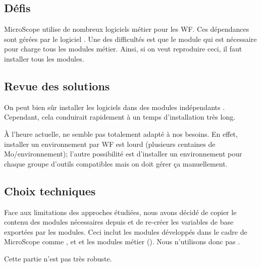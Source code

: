 \subsection{Défis}

MicroScope utilise de nombreux logiciels métier pour les WF.
Ces dépendances sont gérées par le logiciel .
Une des difficultés est que le module  qui est nécessaire pour 
charge tous les modules métier.
Ainsi, si on veut reproduire ceci, il faut installer tous les modules.

\subsection{Revue des solutions}

On peut bien sûr installer les logiciels dans des modules indépendants .
Cependant, cela conduirait rapidement à un temps d'installation très long.

À l'heure actuelle,  ne semble pas totalement adapté à nos besoins.
En effet, installer un environnement par WF est lourd (plusieurs centaines de Mo/environnement);
l'autre possibilité est d'installer un environnement pour chaque groupe d'outils compatibles mais on doit gérer ça manuellement.

\subsection{Choix techniques}

Face aux limitations des approches étudiées, nous avons décidé de copier le contenu des modules nécessaires depuis 
et de re-créer les variables de base exportées par les modules.
Ceci inclut les modules développés dans le cadre de MicroScope comme ,  et 
et les modules métier ().
Nous n'utilisons donc pas .


Cette partie n'est pas très robuste.
